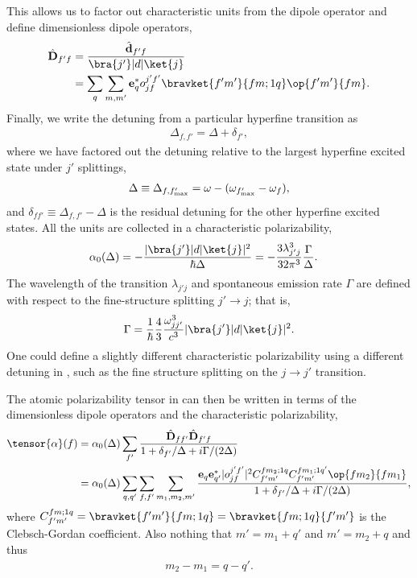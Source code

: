 \documentclass[]{report}
\begin{document}
This allows us to factor out characteristic units from the dipole operator and define dimensionless dipole operators,
	\begin{align}
		\hat{ \mathbf{D}}_{f' f} & = \frac{ \hat{ \mathbf{d} }_{f' f} }{\bra{ j' }| d | \ket{ j } } \\
		& = \sum_q \sum_{m, m'} \mathbf{e}_q^* o^{j' f'}_{j f} \bravket{f' m'}{f m; 1 q} \op{f' m'}{f m}. 
	\end{align}
Finally, we write the detuning from a particular hyperfine transition as
	\begin{align}
		\Delta_{f,f'} = \Delta + \delta_{f'},
	\end{align}
where we have factored out the detuning relative to the largest hyperfine excited state under $ j' $ splittings,
	\begin{align} \label{Eq::DetuningChoice}
		\Delta \equiv \Delta_{f,f'_{\rm max}} = \omega - ( \omega_{f'_{\rm max}} - \omega_f),
	\end{align} 
and $\delta_{f f'} \equiv \Delta_{f,f'} - \Delta$ is the residual detuning for the other hyperfine excited states.  All the units are collected in a characteristic polarizability,
	\begin{align} \label{Eq::alpha0}
		\alpha_0(\Delta) & =  -\frac{|  \bra{ j' }| d | \ket{ j } |^2}{\hbar \Delta } = - \frac{3 \lambda_{j' j}^3}{32 \pi^3} \frac{ \Gamma }{ \Delta }.
	\end{align}
The wavelength of the transition $\lambda_{j' j}$ and spontaneous emission rate $\Gamma$ are defined with respect to the fine-structure splitting $j' \rightarrow j$; that is,
	\begin{align}
		\Gamma = \frac{1}{\hbar} \frac{4}{3} \frac{\omega_{j j'}^3}{c^3} | \bra{ j' }| d | \ket{ j } |^2.
	\end{align}
One could define a slightly different characteristic polarizability using a different detuning in , such as the fine structure splitting on the $j \rightarrow j'$ transition.

The atomic polarizability tensor in  can then be written in terms of the dimensionless dipole operators and the characteristic polarizability,
\begin{align} \label{Eq::AtomicPolarizabilityF}
\tensor{\alpha}(f) &=  \alpha_0(\Delta) \sum_{f'} \frac{ \hat{\mathbf{D}}_{f f'} \hat{\mathbf{D}}_{f' f}}{ 1 + \delta_{f'} / \Delta + i \Gamma/(2\Delta)}\\
& = \alpha_0(\Delta) \sum_{q,q'}  \sum_{f,f'} \sum_{m_1, m_2, m'}  \frac{\mathbf{e}_q \mathbf{e}^*_{q'} | o^{j'f'}_{jf} |^2 C^{fm_2;1q}_{f'm'} C^{fm_1;1q'}_{f'm'} \op{f m_2}{f m_1}}{1 + \delta_{f'} / \Delta + i \Gamma/(2\Delta)},
\end{align}
where $ C^{fm;1q}_{f'm'}=  \bravket{f' m'}{f m; 1 q}= \bravket{f m; 1 q}{f' m'}$ is the Clebsch-Gordan coefficient. Also nothing that $m' = m_1 + q'$ and $m' = m_2 + q$ and thus
\begin{align}
	m_2 - m_1 = q-q'.
\end{align}
\end{document}
